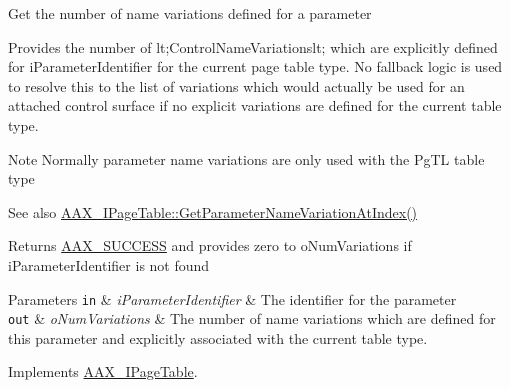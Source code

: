 Get the number of name variations defined for a parameter

Provides the number of {\ttfamily lt;Control\+Name\+Variationslt;} which are explicitly defined for {\ttfamily i\+Parameter\+Identifier} for the current page table type. No fallback logic is used to resolve this to the list of variations which would actually be used for an attached control surface if no explicit variations are defined for the current table type.

\begin{DoxyNote}{Note}
Normally parameter name variations are only used with the {\ttfamily \textquotesingle{}Pg\+T\+L\textquotesingle{}} table type
\end{DoxyNote}

\begin{DoxyItemize}
\item \begin{DoxySeeAlso}{See also}
\hyperlink{a00107_adffe5a5f2ad548bd4c704508d816d568}{A\+A\+X\+\_\+\+I\+Page\+Table\+::\+Get\+Parameter\+Name\+Variation\+At\+Index()}
\end{DoxySeeAlso}
\begin{DoxyReturn}{Returns}
\hyperlink{a00207_a5f8c7439f3a706c4f8315a9609811937aeddbd1bb67e3a66e6af54a4b4a7a57b3}{A\+A\+X\+\_\+\+S\+U\+C\+C\+E\+S\+S} and provides zero to {\ttfamily o\+Num\+Variations} if {\ttfamily i\+Parameter\+Identifier} is not found
\end{DoxyReturn}

\begin{DoxyParams}[1]{Parameters}
\mbox{\tt in}  & {\em i\+Parameter\+Identifier} & The identifier for the parameter \\
\hline
\mbox{\tt out}  & {\em o\+Num\+Variations} & The number of name variations which are defined for this parameter and explicitly associated with the current table type. \\
\hline
\end{DoxyParams}

\end{DoxyItemize}

Implements \hyperlink{a00107_af8be797a3ec7ed3117e720dd29ea7cc7}{A\+A\+X\+\_\+\+I\+Page\+Table}.

\hypertarget{a00138_ace03c8cf21d7cadb1a65df8bd2969d77}{}
